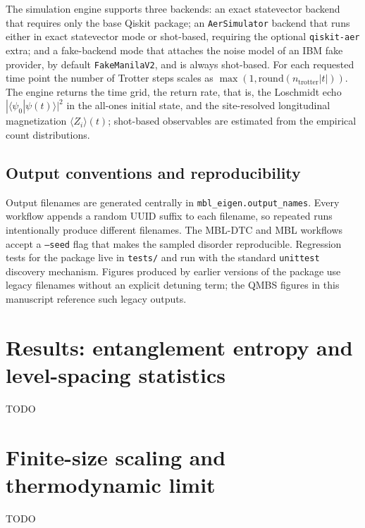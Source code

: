 \documentclass[longbibliography]{revtex4-2}
\begin{document}
The simulation engine supports three backends: an exact statevector
backend that requires only the base Qiskit package; an
\texttt{AerSimulator} backend that runs either in exact statevector mode
or shot-based, requiring the optional \texttt{qiskit-aer} extra; and a
fake-backend mode that attaches the noise model of an IBM fake provider,
by default \texttt{FakeManilaV2}, and is always shot-based. For each
requested time point the number of Trotter steps scales as
$\max(1, \mathrm{round}(n_{\mathrm{trotter}} |t|))$. The engine returns
the time grid, the return rate, that is, the Loschmidt echo
$|\langle \psi_0 | \psi(t) \rangle|^{2}$ in the all-ones initial state,
and the site-resolved longitudinal magnetization
$\langle Z_i \rangle(t)$; shot-based observables are estimated from the
empirical count distributions.

\subsection{Output conventions and reproducibility}\label{subsec:reproducibility}

Output filenames are generated centrally in
\texttt{mbl\_eigen.output\_names}. Every workflow appends a random UUID
suffix to each filename, so repeated runs intentionally produce
different filenames. The MBL-DTC and MBL workflows
accept a \texttt{--seed} flag that makes the sampled disorder
reproducible. Regression tests for the package live in \texttt{tests/}
and run with the standard \texttt{unittest} discovery mechanism.
Figures produced by earlier versions of the package use legacy
filenames without an explicit detuning term; the QMBS figures in this
manuscript reference such legacy outputs.

\section{Results: entanglement entropy and level-spacing statistics}\label{sec:results}

TODO

\section{Finite-size scaling and thermodynamic limit}\label{sec:finite-size-scaling}

TODO


\end{document}
